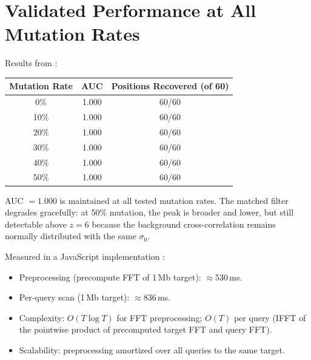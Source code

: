 \section{Validated Performance at All Mutation Rates}
\label{sec:interference_performance}

\begin{keyresult}
Results from \citet{Sachikonye2025_Interference}:
\begin{center}
\begin{tabular}{ccc}
\toprule
Mutation Rate & AUC & Positions Recovered (of 60) \\
\midrule
0\%  & 1.000 & 60/60 \\
10\% & 1.000 & 60/60 \\
20\% & 1.000 & 60/60 \\
30\% & 1.000 & 60/60 \\
40\% & 1.000 & 60/60 \\
50\% & 1.000 & 60/60 \\
\bottomrule
\end{tabular}
\end{center}
AUC $= 1.000$ is maintained at all tested mutation rates. The matched filter
degrades gracefully: at 50\% mutation, the peak is broader and lower, but still
detectable above $z=6$ because the background cross-correlation remains
normally distributed with the same $\sigma_0$.
\end{keyresult}

\begin{keyresult}
Measured in a JavaScript implementation \citep{Sachikonye2025_Interference}:
\begin{itemize}
  \item Preprocessing (precompute FFT of 1\,Mb target): $\approx 530$\,ms.
  \item Per-query scan (1\,Mb target): $\approx 836$\,ms.
  \item Complexity: $O(T \log T)$ for FFT preprocessing; $O(T)$ per query
        (IFFT of the pointwise product of precomputed target FFT and query FFT).
  \item Scalability: preprocessing amortized over all queries to the same target.
\end{itemize}
\end{keyresult}

